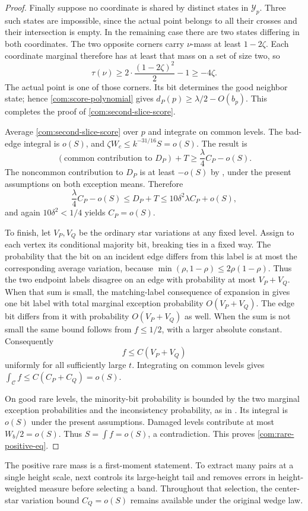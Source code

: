 \begin{proof}
Finally suppose no coordinate is shared by distinct states in
\(\mathcal Y_p\). Three such states are impossible, since the actual point
belongs to all their crosses and their intersection is empty. In the
remaining case there are two states differing in both coordinates. The two
opposite corners carry \(\nu\)-mass at least \(1-2\zeta\). Each coordinate
marginal therefore has at least that mass on a set of size two, so
\[
 \tau(\nu)\ge
  2\cdot\frac{(1-2\zeta)^2}{2}-1\ge-4\zeta.
\]
The actual point is one of those corners. Its bit determines the good
neighbor state; hence \eqref{com:score-polynomial} gives
\(d_P(p)\ge\lambda/2-O(b_p)\). This completes the proof of
\eqref{com:second-slice-score}.

Average \eqref{com:second-slice-score} over \(p\) and integrate on common
levels. The bad-edge integral is \(o(S)\), and
\(\zeta W_c\le k^{-31/16}S=o(S)\). The result is
\[
 (\text{common contribution to }D_P)+T
       \ge\frac\lambda4 C_P-o(S).
\]
The noncommon contribution to \(D_P\) is at least \(-o(S)\) by
, under the present assumptions on both exception
means. Therefore
\[
 \frac\lambda4 C_P-o(S)
 \le D_P+T\le10\delta^2\lambda C_P+o(S),
\]
and again \(10\delta^2<1/4\) yields \(C_P=o(S)\).

To finish, let \(V_P,V_Q\) be the ordinary star variations at any fixed
level. Assign to each vertex its conditional majority bit, breaking ties
in a fixed way. The probability that the bit on an incident edge differs
from this label is at most the corresponding average variation, because
\(\min(\rho,1-\rho)\le2\rho(1-\rho)\). Thus the two endpoint labels disagree
on an edge with probability at most \(V_P+V_Q\). When that sum is small,
the matching-label consequence of expansion in  gives
one bit label with total marginal exception probability
\(O(V_P+V_Q)\). The edge bit differs from it with probability
\(O(V_P+V_Q)\) as well. When the sum is not small the same bound follows
from \(f\le1/2\), with a larger absolute constant. Consequently
\[
 f\le C(V_P+V_Q)
\]
uniformly for all sufficiently large \(t\). Integrating on common levels
gives \(\int_{\mathcal C}f\le C(C_P+C_Q)=o(S)\).

On good rare levels, the minority-bit probability is bounded by the two
marginal exception probabilities and the inconsistency probability, as in
. Its integral is \(o(S)\) under the present
assumptions. Damaged levels contribute at most \(W_b/2=o(S)\). Thus
\(S=\int f=o(S)\), a contradiction. This proves
\eqref{com:rare-positive-eq}.
\end{proof}

The positive rare mass is a first-moment statement. To extract many
pairs at a single height scale,  next controls its
large-height tail and removes errors in height-weighted measure before
selecting a band. Throughout that selection, the center-star variation
bound $C_Q=o(S)$ remains available under the original wedge law.
